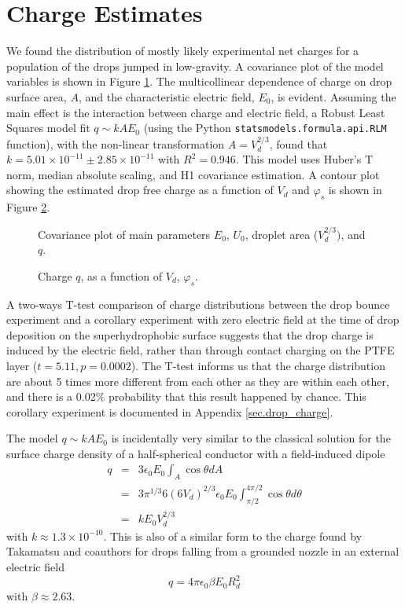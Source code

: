 \documentclass[10pt,a4paper]{article}
\author{Erin Schmidt}
\begin{document}
\doublespacing
\section{Charge Estimates}
We found the distribution of mostly likely experimental net charges for a population of the drops jumped in low-gravity. A covariance plot of the model variables is shown in Figure \ref{fig:scatter}. The multicollinear dependence of charge on drop surface area, $A$, and the characteristic electric field, $E_0$, is evident. Assuming the main effect is the interaction between charge and electric field, a Robust Least Squares model fit $q \sim kAE_0$ (using the Python \verb|statsmodels.formula.api.RLM| function), with the non-linear transformation $A = V_d^{2/3}$, found that $k=5.01 \times 10^{-11} \pm  2.85 \times 10^{-11}$ with $R^2 = 0.946$. This model uses Huber's T norm, median absolute scaling, and H1 covariance estimation. A contour plot showing the estimated drop free charge as a function of $V_d$ and $\varphi_s$ is shown in Figure \ref{fig:charge}.
\begin{figure}[H]
    \centering
    \resizebox{12cm}{!}{}
    \caption{Covariance plot of main parameters $E_0$, $U_0$, droplet area ($V_d^{2/3})$, and $q$.\label{fig:scatter}}
\end{figure}
\begin{figure}[H]
    \centering
    
    \caption{Charge $q$, as a function of $V_d$, $\varphi_s$.\label{fig:charge}}
\end{figure}

A two-ways T-test comparison of charge distributions between the drop bounce experiment and a corollary experiment with zero electric field at the time of drop deposition on the superhydrophobic surface suggests that the drop charge is induced by the electric field, rather than through contact charging on the PTFE layer ($t = 5.11, p = 0.0002$). The T-test informs us that the charge distribution  are about 5 times more different from each other as they are within each other, and there is a 0.02$\%$ probability that this result happened by chance. This corollary experiment is documented in Appendix \ref{sec.drop_charge}.

The model $q \sim kAE_0$ is incidentally very similar to the classical solution for the surface charge density of a half-spherical conductor with a field-induced dipole \cite{david_j._griffiths_introduction_1999}
\begin{eqnarray*}
q &=& 3 \epsilon_0 E_0 \int_A \cos \theta dA \\
&=& 3 \pi^{1/3} 6 \left(6 V_d \right)^{2/3} \epsilon_0 E_0 \int^{4 \pi/2}_{\pi / 2} \cos \theta d\theta \\
&=& k E_0 V_d^{2/3}
\end{eqnarray*}
with $k \approx 1.3 \times 10^{-10}$. This is also of a similar form to the charge found by Takamatsu and coauthors for drops falling from a grounded nozzle in an external electric field \cite{takamatsu_theoretical_1981}
\[q = 4 \pi \epsilon_0 \beta E_0 R_d^2 \]
with $\beta \approx 2.63$.
\end{document}
